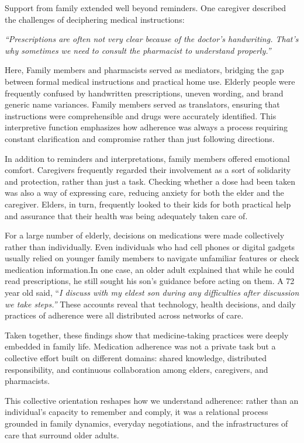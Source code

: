 \documentclass[acmlarge]{acmart}
\begin{document}
Support from family extended well beyond reminders. One caregiver
described the challenges of deciphering medical instructions:

\emph{``Prescriptions are often not very clear because of the doctor's
handwriting. That's why sometimes we need to consult the pharmacist to
understand properly.''}

Here, Family members and pharmacists served as mediators, bridging the
gap between formal medical instructions and practical home use. Elderly
people were frequently confused by handwritten prescriptions, uneven
wording, and brand generic name variances. Family members served as
translators, ensuring that instructions were comprehensible and drugs
were accurately identified. This interpretive function emphasizes how
adherence was always a process requiring constant clarification and
compromise rather than just following directions.

In addition to reminders and interpretations, family members offered
emotional comfort. Caregivers frequently regarded their involvement as a
sort of solidarity and protection, rather than just a task. Checking
whether a dose had been taken was also a way of expressing care,
reducing anxiety for both the elder and the caregiver. Elders, in turn,
frequently looked to their kids for both practical help and assurance
that their health was being adequately taken care of.

For a large number of elderly, decisions on medications were made
collectively rather than individually. Even individuals who had cell
phones or digital gadgets usually relied on younger family members to
navigate unfamiliar features or check medication information.In one
case, an older adult explained that while he could read prescriptions,
he still sought his son's guidance before acting on them. A 72 year old
said, ``\emph{I discuss with my eldest son during any difficulties after
discussion we take steps.''} These accounts reveal that technology,
health decisions, and daily practices of adherence were all distributed
across networks of care.

Taken together, these findings show that medicine-taking practices were
deeply embedded in family life. Medication adherence was not a private
task but a collective effort built on different domains: shared
knowledge, distributed responsibility, and continuous collaboration
among elders, caregivers, and pharmacists.

This collective orientation reshapes how we understand adherence: rather
than an individual's capacity to remember and comply, it was a
relational process grounded in family dynamics, everyday negotiations,
and the infrastructures of care that surround older adults.
\end{document}
